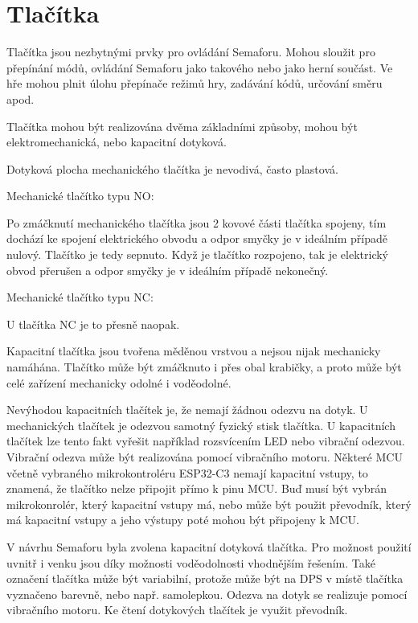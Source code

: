 \section{Tlačítka}
Tlačítka jsou nezbytnými prvky pro ovládání Semaforu. Mohou sloužit pro přepínání módů, ovládání Semaforu jako takového nebo jako herní 
součást. Ve hře mohou plnit úlohu přepínače režimů hry, zadávání kódů, určování směru apod. 

Tlačítka mohou být realizována dvěma základními způsoby, mohou být elektromechanická, nebo kapacitní dotyková. 

Dotyková plocha mechanického tlačítka je nevodivá, často plastová. 

Mechanické tlačítko typu NO: %

Po zmáčknutí mechanického tlačítka jsou 2 kovové části tlačítka spojeny, tím dochází ke spojení elektrického obvodu 
a odpor smyčky je v ideálním případě nulový. Tlačítko je tedy sepnuto. Když je tlačítko rozpojeno, tak je 
elektrický obvod přerušen a odpor smyčky je v ideálním případě nekonečný.

Mechanické tlačítko typu NC: %

U tlačítka NC je to přesně naopak. %


Kapacitní tlačítka jsou tvořena měděnou vrstvou a nejsou nijak mechanicky namáhána. Tlačítko může být zmáčknuto i přes 
obal krabičky, a proto může být celé zařízení mechanicky odolné i voděodolné. 

Nevýhodou kapacitních tlačítek je, že nemají žádnou odezvu na dotyk. U mechanických tlačítek je odezvou samotný fyzický 
stisk tlačítka. U kapacitních tlačítek lze tento fakt vyřešit například rozsvícením LED nebo vibrační odezvou. Vibrační 
odezva může být realizována pomocí vibračního motoru. Některé MCU včetně vybraného mikrokontroléru ESP32-C3 nemají kapacitní
vstupy, to znamená, že tlačítko nelze připojit přímo k pinu MCU. Buď musí být vybrán mikrokonrolér, který kapacitní vstupy má,
nebo může být použit převodník, který má kapacitní vstupy a jeho výstupy poté mohou být připojeny k MCU. 

V návrhu Semaforu byla zvolena kapacitní dotyková tlačítka. Pro možnost použití uvnitř i venku jsou díky možnosti voděodolnosti 
vhodnějším řešením. Také označení tlačítka může být variabilní, protože může být na DPS v místě tlačítka vyznačeno barevně, nebo 
např. samolepkou. Odezva na dotyk se realizuje pomocí vibračního motoru. Ke čtení dotykových tlačítek je využit převodník. 

